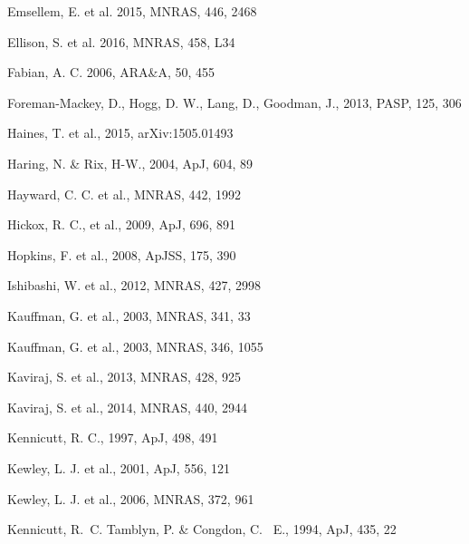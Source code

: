 \documentclass[useAMS,usenatbib]{mn2e}
\begin{document}
\begin{thebibliography}{}
 Emsellem, E. et al. 2015, MNRAS, 446, 2468

 Ellison, S. et al. 2016, MNRAS, 458, L34

 Fabian, A. C. 2006, ARA\&A, 50, 455

 Foreman-Mackey, D., Hogg, D. W., Lang, D., Goodman, J., 2013, PASP, 125, 306

 Haines, T. et al., 2015, arXiv:1505.01493

 Haring, N. \& Rix, H-W., 2004, ApJ, 604, 89

 Hayward, C. C. et al., MNRAS, 442, 1992

 Hickox, R. C., et al., 2009, ApJ, 696, 891

 Hopkins, F. et al., 2008, ApJSS, 175, 390

 Ishibashi, W. et al., 2012, MNRAS, 427, 2998

 Kauffman, G. et al., 2003, MNRAS, 341, 33

 Kauffman, G. et al., 2003, MNRAS, 346, 1055


 Kaviraj, S. et al., 2013, MNRAS, 428, 925

 Kaviraj, S. et al., 2014, MNRAS, 440, 2944

 Kennicutt, R. C., 1997, ApJ, 498, 491

 Kewley, L. J. et al., 2001, ApJ, 556, 121

 Kewley, L. J. et al., 2006, MNRAS, 372, 961

 Kennicutt, R.~C. Tamblyn, P. \& Congdon, C. ~E., 1994, ApJ, 435, 22


\end{thebibliography}
\end{document}
